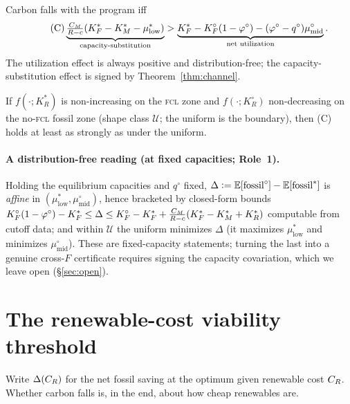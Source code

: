 \documentclass[11pt,reqno]{amsart}
\theoremstyle{plain}
\theoremstyle{definition}\newtheorem{condition}{Condition}\newtheorem{assumption}{Assumption}
\theoremstyle{remark}\newtheorem{remark}{Remark}
\newcommand{\KRs}{K_R^{*}}\newcommand{\KFs}{K_F^{*}}\newcommand{\KMs}{K_M^{*}}
\newcommand{\KRo}{K_R^{\circ}}\newcommand{\KFo}{K_F^{\circ}}
\newcommand{\E}{\mathbb{E}}\newcommand{\PP}{\mathbb{P}}\newcommand{\eqdef}{\vcentcolon=}
\newcommand{\Ucal}{\mathcal U}
\begin{document}
\begin{proposition}\label{prop:C}
Carbon falls with the program iff
\begin{equation}\tag{C}\label{eq:C}
  \underbrace{\tfrac{\CM}{R-c}(\KFs-\KMs-\mu^{*}_{\mathrm{low}})}_{\text{capacity-substitution}}
  >
  \underbrace{\KFs-\KFo(1-\varphi^{\circ})-(\varphi^{\circ}-q^{\circ})\mu^{\circ}_{\mathrm{mid}}}_{\text{net utilization}}.
\end{equation}
The utilization effect is always positive and distribution-free; the
capacity-substitution effect is signed by Theorem~\ref{thm:channel}.
\end{proposition}

\begin{corollary}\label{cor:suff}
If $f(\cdot;\KRs)$ is non-increasing on the \textsc{fcl} zone and $f(\cdot;\KRo)$
non-decreasing on the no-\textsc{fcl} fossil zone (shape class $\Ucal$; the uniform
is the boundary), then (C) holds at least as strongly as under the uniform.
\end{corollary}

\paragraph{A distribution-free reading (at fixed capacities; Role~1).} Holding the
equilibrium capacities and $q^{\circ}$ fixed, $\Delta\eqdef\E[\text{fossil}^{\circ}]-\E[\text{fossil}^{*}]$
is \emph{affine} in $(\mu^{*}_{\mathrm{low}},\mu^{\circ}_{\mathrm{mid}})$, hence
bracketed by closed-form bounds
$\KFo(1-\varphi^{\circ})-\KFs\le\Delta\le\KFo-\KFs+\tfrac{\CM}{R-c}(\KFs-\KMs+\KRs)$
computable from cutoff data; and within $\Ucal$ the uniform minimizes $\Delta$
(it maximizes $\mu^{*}_{\mathrm{low}}$ and minimizes $\mu^{\circ}_{\mathrm{mid}}$).
These are fixed-capacity statements; turning the last into a genuine cross-$F$
certificate requires signing the capacity covariation, which we leave open
(\S\ref{sec:open}).

\section{The renewable-cost viability threshold}\label{sec:threshold}

Write $\Delta(C_R)$ for the net fossil saving at the optimum given renewable cost
$C_R$. Whether carbon falls is, in the end, about how cheap renewables are.
\end{document}
